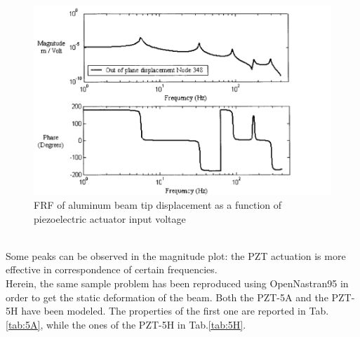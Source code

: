 \documentclass[twocolumn,a4paper,10pt,english]{article}
\begin{document}
	    \begin{figure}[htp]
	    	\centering
	    	\includegraphics[width=0.6\linewidth]{images/frf.png}
	    	\caption{FRF of aluminum beam tip displacement as a function of piezoelectric actuator input voltage}
	    	\label{fig:frf}
	    \end{figure}\\ 
	    Some peaks can be observed in the magnitude plot: the PZT actuation is more effective in correspondence of certain frequencies.\\
	    Herein, the same sample problem has been reproduced using OpenNastran95 in order to get the static deformation of the beam. Both the PZT-5A and the PZT-5H have been modeled. The properties of the first one are reported in Tab.\ref{tab:5A}, while the ones of the PZT-5H in Tab.\ref{tab:5H}.
	    
\end{document}
